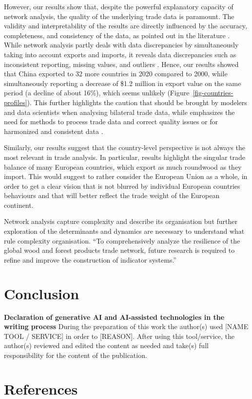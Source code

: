 \documentclass[
  authoryear,
  review,
  3p]{elsarticle}
\begin{document}
However, our results show that, despite the powerful explanatory
capacity of network analysis, the quality of the underlying trade data
is paramount. The validity and interpretability of the results are
directly influenced by the accuracy, completeness, and consistency of
the data, as pointed out in the literature
\citep{lovric_social_2018, wang_exploratory_2020, zhou_spatial_2021, huang_static_2024}.
While network analysis partly deals with data discrepancies by
simultaneously taking into account exports and imports, it reveals data
discrepancies such as inconsistent reporting, missing values, and
outliers \citep{kallio_reliability_2018, chen_advancing_2022}. Hence,
our results showed that China exported to 32 more countries in 2020
compared to 2000, while simultaneously reporting a decrease of \$1.2
million in export value on the same period (a decline of about 16\%),
which seems unlikely (Figure~\ref{fig-countries-profiles}). This further
highlights the caution that should be brought by modelers and data
scientists when analysing bilateral trade data, while emphasizes the
need for methods to process trade data and correct quality issues or for
harmonized and consistent data
\citep{gaulier_baci_2010, rougieux_forest_2017}.

Similarly, our results suggest that the country-level perspective is not
always the most relevant in trade analysis. In particular, results
highlight the singular trade balance of many European countries, which
export as much roundwood as they import. This would suggest to rather
consider the European Union as a whole, in order to get a clear vision
that is not blurred by individual European countries behaviours and that
will better reflect the trade weight of the European continent.

Network analysis capture complexity and describe its organisation but
further exploration of the determinants and dynamics are necessary to
understand what rule complexity organisation. ``To comprehensively
analyze the resilience of the global wood and forest products trade
network, future research is required to refine and improve the
construction of indicator systems.''

\section{Conclusion}\label{conclusion}

\textbf{Declaration of generative AI and AI-assisted technologies in the
writing process} During the preparation of this work the author(s) used
{[}NAME TOOL / SERVICE{]} in order to {[}REASON{]}. After using this
tool/service, the author(s) reviewed and edited the content as needed
and take(s) full responsibility for the content of the publication.

\section*{References}\label{references}

\renewcommand{\bibsection}{}

\end{document}
